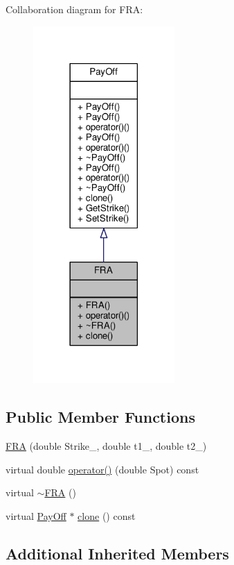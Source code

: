 Collaboration diagram for F\+RA\+:
\nopagebreak
\begin{figure}[H]
\begin{center}
\leavevmode
\includegraphics[width=153pt]{classFRA__coll__graph}
\end{center}
\end{figure}
\subsection*{Public Member Functions}
\begin{DoxyCompactItemize}
\item 
\hyperlink{classFRA_a1a79b1ee95936f7daf8e07b6aceec75a}{F\+RA} (double Strike\+\_\+, double t1\+\_\+, double t2\+\_\+)
\item 
virtual double \hyperlink{classFRA_a48544283b697cd1d25c476acb6ed62df}{operator()} (double Spot) const
\item 
virtual \hyperlink{classFRA_a11650948142f6b90aeef7816d8aa65ac}{$\sim$\+F\+RA} ()
\item 
virtual \hyperlink{classPayOff}{Pay\+Off} $\ast$ \hyperlink{classFRA_a0f2a7b7852bbd747b5673bd9016f5cf0}{clone} () const
\end{DoxyCompactItemize}
\subsection*{Additional Inherited Members}


